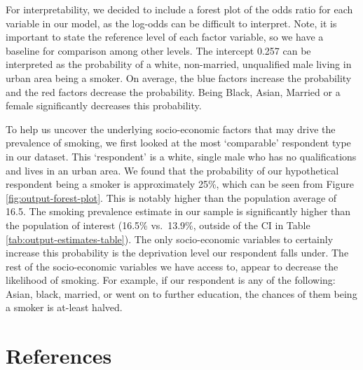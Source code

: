 \documentclass[
  11pt,
  twocolumn]{article}
\begin{document}
For interpretability, we decided to include a forest plot of the odds
ratio for each variable in our model, as the log-odds can be difficult
to interpret. Note, it is important to state the reference level of each
factor variable, so we have a baseline for comparison among other
levels. The intercept 0.257 can be interpreted as the probability of a
white, non-married, unqualified male living in urban area being a
smoker. On average, the blue factors increase the probability and the
red factors decrease the probability. Being Black, Asian, Married or a
female significantly decreases this probability.

To help us uncover the underlying socio-economic factors that may drive
the prevalence of smoking, we first looked at the most `comparable'
respondent type in our dataset. This `respondent' is a white, single
male who has no qualifications and lives in an urban area. We found that
the probability of our hypothetical respondent being a smoker is
approximately 25\%, which can be seen from Figure
\ref{fig:output-forest-plot}. This is notably higher than the population
average of 16.5. The smoking prevalence estimate in our sample is
significantly higher than the population of interest (16.5\% vs.~13.9\%,
outside of the CI in Table \ref{tab:output-estimates-table}). The only
socio-economic variables to certainly increase this probability is the
deprivation level our respondent falls under. The rest of the
socio-economic variables we have access to, appear to decrease the
likelihood of smoking. For example, if our respondent is any of the
following: Asian, black, married, or went on to further education, the
chances of them being a smoker is at-least halved.

\clearpage
\onecolumn

\section*{References}\label{references}
\end{document}
